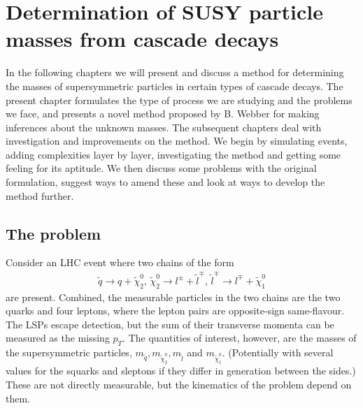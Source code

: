 \documentclass[twoside,english]{uiofysmaster}
\begin{document}
\chapter{Determination of SUSY particle masses from cascade decays}%
\label{ch:introducing_the_method}


In the following chapters we will present and discuss a method for determining the masses of supersymmetric particles in certain types of cascade decays. The present chapter formulates the type of process we are studying and the problems we face, and presents a novel method proposed by B. Webber \cite{Webber:2009vm} for making inferences about the unknown masses. The subsequent chapters deal with investigation and improvements on the method. We begin by simulating events, adding complexities layer by layer, investigating the method and getting some feeling for its aptitude. We then discuss some problems with the original formulation, suggest ways to amend these and look at ways to develop the method further.

\section{The problem}
Consider an LHC event where two chains of the form
\begin{align}
	\tilde{q} \to q + \tilde{\chi}_2^0, \, \tilde{\chi}_2^0 \to l^{\pm} + \tilde{l}^\mp, \, \tilde{l}^\mp \to l^\mp + \tilde{\chi}_1^0\label{eq:goldencascade}
\end{align}
are present. Combined, the measurable particles in the two chains are the two quarks and four leptons, where the lepton pairs are opposite-sign same-flavour. The LSPs escape detection, but the sum of their transverse momenta can be measured as the missing $p_T$. The quantities of interest, however, are the masses of the supersymmetric particles, $m_{\tilde{q}}, m_{\tilde{\chi}_2^0}, m_{\tilde{l}}$ and $m_{\tilde{\chi}_1^0}$. (Potentially with several values for the squarks and sleptons if they differ in generation between the sides.) These are not directly measurable, but the kinematics of the problem depend on them. 
\end{document}
